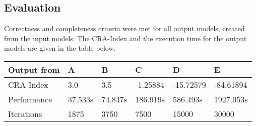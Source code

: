 \documentclass[a4paper]{article}
\begin{document}
\subsection{Evaluation}

Correctness and completeness criteria were met for all output models, created from the input models.
The CRA-Index and the execution time for the output models are given in the table below.

\begin{table}[ht]
\begin{center}
\begin{tabular}{|l|l|l|l|l|l|}
\hline
Output from & A & B & C & D & E\\
\hline
CRA-Index & 3.0 & 3.5 & -1.25884 & -15.72579 & -84.61894\\
\hline
Performance & 37.533s & 74.847s & 186.919s & 586.493s & 1927.053s\\
\hline
Iterations & 1875 & 3750 & 7500 & 15000 & 30000\\
\hline
\end{tabular}
\end{center}
\end{table}

~\cite{Abdelhalim2013}

 

\end{document}
